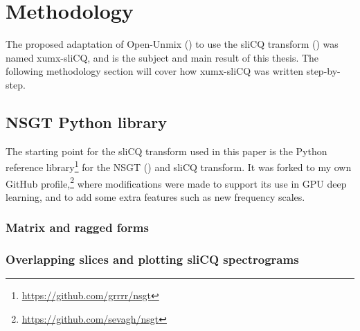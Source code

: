 \documentclass[report.tex]{subfiles}
\begin{document}

\vfill
\clearpage

\section{Methodology}

The proposed adaptation of Open-Unmix (\cite{umx}) to use the sliCQ transform (\cite{slicq}) was named xumx-sliCQ, and is the subject and main result of this thesis. The following methodology section will cover how xumx-sliCQ was written step-by-step.

\subsection{NSGT Python library}

The starting point for the sliCQ transform used in this paper is the Python reference library\footnote{\url{https://github.com/grrrr/nsgt}} for the NSGT (\cite{slicq}) and sliCQ transform. It was forked to my own GitHub profile,\footnote{\url{https://github.com/sevagh/nsgt}} where modifications were made to support its use in GPU deep learning, and to add some extra features such as new frequency scales.

\subsubsection{Matrix and ragged forms}


\subsubsection{Overlapping slices and plotting sliCQ spectrograms}


\end{document}
